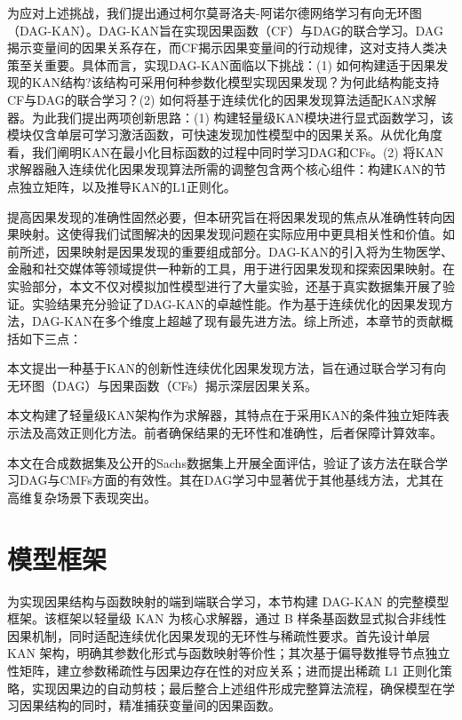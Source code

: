 为应对上述挑战，我们提出通过柯尔莫哥洛夫-阿诺尔德网络学习有向无环图（DAG-KAN）。DAG-KAN旨在实现因果函数（CF）与DAG的联合学习。DAG揭示变量间的因果关系存在，而CF揭示因果变量间的行动规律，这对支持人类决策至关重要。具体而言，实现DAG-KAN面临以下挑战：(1) 如何构建适于因果发现的KAN结构?该结构可采用何种参数化模型实现因果发现？为何此结构能支持CF与DAG的联合学习？(2) 如何将基于连续优化的因果发现算法适配KAN求解器。为此我们提出两项创新思路：(1) 构建轻量级KAN模块进行显式函数学习，该模块仅含单层可学习激活函数，可快速发现加性模型中的因果关系。从优化角度看，我们阐明KAN在最小化目标函数的过程中同时学习DAG和CFs。(2) 将KAN求解器融入连续优化因果发现算法所需的调整包含两个核心组件：构建KAN的节点独立矩阵，以及推导KAN的L1正则化。

提高因果发现的准确性固然必要，但本研究旨在将因果发现的焦点从准确性转向因果映射。这使得我们试图解决的因果发现问题在实际应用中更具相关性和价值。如前所述，因果映射是因果发现的重要组成部分。DAG-KAN的引入将为生物医学、金融和社交媒体等领域提供一种新的工具，用于进行因果发现和探索因果映射。在实验部分，本文不仅对模拟加性模型进行了大量实验，还基于真实数据集开展了验证。实验结果充分验证了DAG-KAN的卓越性能。作为基于连续优化的因果发现方法，DAG-KAN在多个维度上超越了现有最先进方法。综上所述，本章节的贡献概括如下三点：

\begin{compactenum}
	\item 本文提出一种基于KAN的创新性连续优化因果发现方法，旨在通过联合学习有向无环图（DAG）与因果函数（CFs）揭示深层因果关系。
	\item 本文构建了轻量级KAN架构作为求解器，其特点在于采用KAN的条件独立矩阵表示法及高效正则化方法。前者确保结果的无环性和准确性，后者保障计算效率。
	\item 本文在合成数据集及公开的Sachs数据集上开展全面评估，验证了该方法在联合学习DAG与CMFs方面的有效性。其在DAG学习中显著优于其他基线方法，尤其在高维复杂场景下表现突出。
\end{compactenum}


\section{模型框架}
为实现因果结构与函数映射的端到端联合学习，本节构建 DAG-KAN 的完整模型框架。该框架以轻量级 KAN 为核心求解器，通过 B 样条基函数显式拟合非线性因果机制，同时适配连续优化因果发现的无环性与稀疏性要求。首先设计单层 KAN 架构，明确其参数化形式与函数映射等价性；其次基于偏导数推导节点独立性矩阵，建立参数稀疏性与因果边存在性的对应关系；进而提出稀疏 L1 正则化策略，实现因果边的自动剪枝；最后整合上述组件形成完整算法流程，确保模型在学习因果结构的同时，精准捕获变量间的因果函数。

